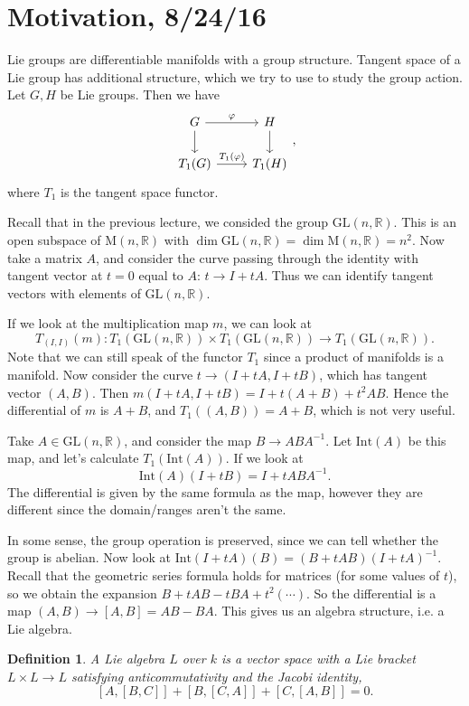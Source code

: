\documentclass[letterpaper, 12pt]{article}
\newtheorem{definition}[thm]{Definition}
\newcommand{\reals}{\mathbb{R}}
\newcommand{\Tone}{T_1}
\newcommand{\T}[1]{\Tone(#1)}
\newcommand{\Tvar}[1]{T_{#1}}
\newcommand{\csq}[9]{\[
	\begin{tikzcd}[ampersand replacement=\&]
	{#1} \arrow{r}{#5} \arrow{d}{#6}
		\& {#2} \arrow{d}{#7} \\
	{#3} \arrow{r}{#8}
		\& {#4}
	\end{tikzcd}
#9\]}
\newcommand{\gl}[2]{\mathrm{GL}(#1, #2)}
\newcommand{\mat}[2]{\mathrm{M}(#1, #2)}
\newcommand{\inv}[1]{{#1}^{-1}}
\begin{document}
  \section{Motivation, 8/24/16} Lie groups are differentiable
manifolds with a group structure. Tangent space of a Lie group has additional
structure, which we try to use to study the group action. Let $G, H$ be Lie
groups. Then we have \csq G H {\T G} {\T H} \varphi {} {} {\T \varphi}, where
$\Tone$ is the tangent space functor.

Recall that in the previous lecture, we consided the group $\gl n \reals$.
This is an open subspace of $\mat n \reals$ with $\dim \gl n \reals = \dim
\mat n \reals = n^2$. Now take a matrix $A$, and consider the curve passing
through the identity with tangent vector at $t = 0$ equal to $A$: $t
\rightarrow I + tA$. Thus we can identify tangent vectors with elements of
$\gl n \reals$.

If we look at the multiplication map $m$, we can look at \[\Tvar {(I, I)} (m)
: \T {\gl n \reals} \times \T {\gl n \reals} \rightarrow \T {\gl n \reals}.\]
Note that we can still speak of the functor $\Tone$ since a product of
manifolds is a manifold. Now consider the curve $t \rightarrow (I + tA, I +
tB)$, which has tangent vector $(A, B)$. Then $m(I + tA, I + tB) = I + t(A +
B) + t^2 AB.$ Hence the differential of $m$ is $A + B$, and $\T {(A, B)} = A +
B$, which is not very useful.

Take $A \in \gl n \reals$, and consider the map $B \rightarrow AB\inv A$. Let
$\mathrm{Int}(A)$ be this map, and let's calculate $\T {\mathrm{Int}(A)}.$ If
we look at \[ \mathrm{Int}(A)(I + tB) = I + tAB\inv A.\] The differential is
given by the same formula as the map, however they are different since the
domain/ranges aren't the same.

In some sense, the group operation is preserved, since we can tell whether the
group is abelian. Now look at $\mathrm{Int}(I + tA)(B) = (B + tAB)\inv {(I +
tA)}.$ Recall that the geometric series formula holds for matrices (for some
values of $t$), so we obtain the expansion $B + tAB - tBA + t^2 (\cdots).$ So
the differential is a map $(A, B) \rightarrow [A, B] = AB - BA.$ This gives us
an algebra structure, i.e. a Lie algebra.

\begin{definition} A Lie algebra $L$ over $k$ is a vector space with a Lie
bracket $L \times L \rightarrow L$ satisfying anticommutativity and the Jacobi
identity, \[ [A, [B, C]] + [B, [C, A]] + [C, [A, B]] = 0.\] \end{definition}
\end{document}
